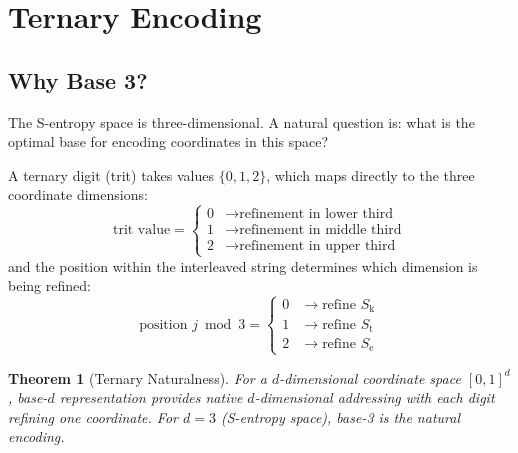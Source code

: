 \documentclass[11pt,twocolumn,a4paper]{article}
\newtheorem{theorem}{Theorem}[section]
\theoremstyle{definition}
\theoremstyle{remark}
\newcommand{\Sk}{S_{\mathrm{k}}}
\newcommand{\St}{S_{\mathrm{t}}}
\newcommand{\Se}{S_{\mathrm{e}}}
\begin{document}
\section{Ternary Encoding}
\label{sec:ternary}

\subsection{Why Base 3?}

The S-entropy space is three-dimensional. A natural question is: what is the optimal base for encoding coordinates in this space?

A ternary digit (trit) takes values $\{0, 1, 2\}$, which maps directly to the three coordinate dimensions:
\begin{equation}
\text{trit value} = \begin{cases}
0 & \to \text{refinement in lower third} \\
1 & \to \text{refinement in middle third} \\
2 & \to \text{refinement in upper third}
\end{cases}
\label{eq:trit_values}
\end{equation}
and the position within the interleaved string determines which dimension is being refined:
\begin{equation}
\text{position } j \bmod 3 = \begin{cases}
0 & \to \text{refine } \Sk \\
1 & \to \text{refine } \St \\
2 & \to \text{refine } \Se
\end{cases}
\label{eq:dimension_assignment}
\end{equation}

\begin{theorem}[Ternary Naturalness]
\label{thm:ternary_natural}
For a $d$-dimensional coordinate space $[0,1]^d$, base-$d$ representation provides native $d$-dimensional addressing with each digit refining one coordinate. For $d = 3$ (S-entropy space), base-3 is the natural encoding.
\end{theorem}
\end{document}
